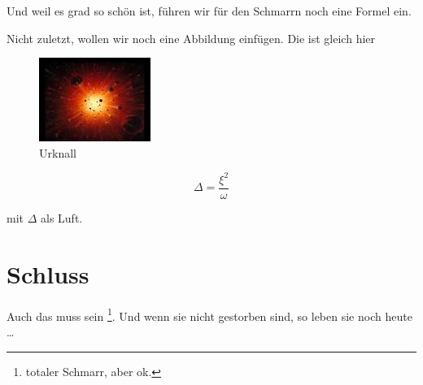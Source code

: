 \documentclass[paper=a4,
			   fontsize=12pt,
			   twocolumn=true
			   ]{scrartcl}
\begin{document}
	Und weil es grad so schön ist, führen wir für den Schmarrn noch eine Formel ein.
	
	Nicht zuletzt, wollen wir noch eine Abbildung einfügen. Die ist gleich hier
	
	\begin{figure}[h]
	\includegraphics{Urknall.jpg}
	\caption{Urknall}
	\end{figure}

	
	
	\begin{equation}
	 \Delta = \frac{\xi^2}{\omega} 
	\end{equation}
	

	
	mit \( \Delta \) als Luft.
	
	 \section{Schluss}
	 
	 Auch das muss sein \footnote{totaler Schmarr, aber ok.}. Und wenn sie nicht gestorben sind, so leben sie noch heute \dots
	
\end{document}
